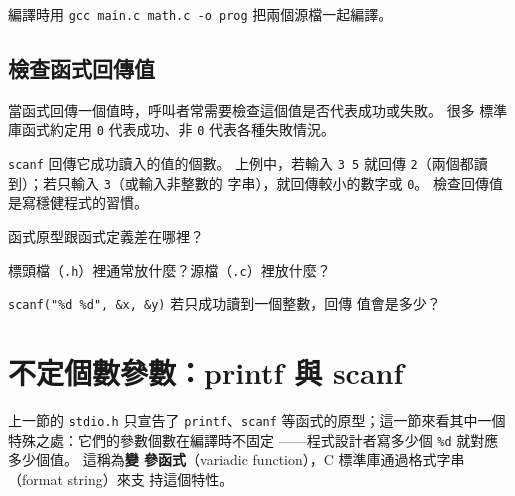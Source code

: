 編譯時用 \texttt{gcc main.c math.c -o prog} 把兩個源檔一起編譯。

\subsection{檢查函式回傳值}

當函式回傳一個值時，呼叫者常需要檢查這個值是否代表成功或失敗。 很多
標準庫函式約定用 \texttt{0} 代表成功、非 \texttt{0} 代表各種失敗情況。



\texttt{scanf} 回傳它成功讀入的值的個數。 上例中，若輸入 \texttt{3 5}
就回傳 \texttt{2}（兩個都讀到）；若只輸入 \texttt{3}（或輸入非整數的
字串），就回傳較小的數字或 \texttt{0}。 檢查回傳值是寫穩健程式的習慣。

\begin{drills}[label=drills:func-declare]
\item 函式原型跟函式定義差在哪裡？
\item 標頭檔（\texttt{.h}）裡通常放什麼？源檔（\texttt{.c}）裡放什麼？
\item \texttt{scanf("\%d \%d", \&x, \&y)} 若只成功讀到一個整數，回傳
值會是多少？
\end{drills}

\section{不定個數參數：printf 與 scanf}
\label{sec:func-variadic}

上一節的 \texttt{stdio.h} 只宣告了 \texttt{printf}、\texttt{scanf}
等函式的原型；這一節來看其中一個特殊之處：它們的參數個數在編譯時不固定
——程式設計者寫多少個 \texttt{\%d} 就對應多少個值。 這稱為\textbf{變
參函式}（variadic function），C 標準庫通過格式字串（format string）來支
持這個特性。

